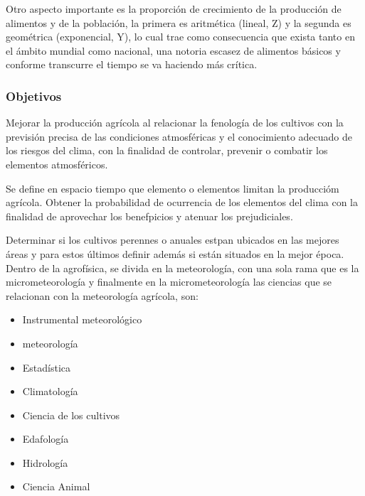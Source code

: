 Otro aspecto importante es la proporción de crecimiento de la producción de alimentos y de la población, la primera es aritmética (lineal, Z) y la segunda es geométrica (exponencial, Y), lo cual trae como consecuencia que exista tanto en el ámbito mundial como nacional, una notoria escasez de alimentos básicos y conforme transcurre el tiempo se va haciendo más crítica.
\subsubsection{Objetivos}
Mejorar la producción agrícola al relacionar la fenología de los cultivos con la previsión precisa de las condiciones atmosféricas y el conocimiento adecuado de los riesgos del clima, con la finalidad de controlar, prevenir o combatir los elementos atmosféricos. 

Se define en espacio tiempo que elemento o elementos limitan la produccióm agrícola. Obtener la probabilidad de ocurrencia de los elementos del clima con la finalidad de aprovechar los benefpicios y atenuar los prejudiciales.

Determinar si los cultivos perennes o anuales estpan ubicados en las mejores áreas y para estos últimos definir además si están situados en la mejor época.
Dentro de la agrofísica, se divida en la meteorología, con una sola rama que es la micrometeorología y finalmente en la micrometeorología
las ciencias que se relacionan con la meteorología agrícola, son:
\begin{itemize}
    \item Instrumental meteorológico
    \item meteorología
    \item Estadística
    \item Climatología
    \item Ciencia de los cultivos
    \item Edafología
    \item Hidrología
    \item Ciencia Animal
\end{itemize}


